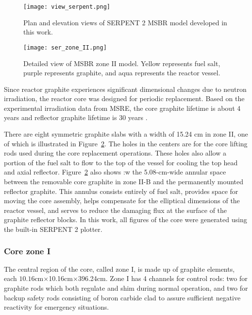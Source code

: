 \begin{figure}[hbp!] %
  \texttt{[image: view\_serpent.png]}
  \caption{Plan and elevation views of SERPENT 2 \gls{MSBR} model developed in 
  this work.}
  \label{fig:serpent_plan_view}
\end{figure}

\begin{figure}[t!] %
  \texttt{[image: ser\_zone\_II.png]}
  \caption{Detailed view of \gls{MSBR} zone II model.  
          Yellow represents fuel salt, purple represents graphite, and aqua represents the reactor vessel.}
  \label{fig:serpent_zoneII}
\end{figure}

Since reactor graphite experiences significant dimensional changes due to 
neutron irradiation, the reactor core was designed for periodic replacement. 
Based on the experimental irradiation data from \gls{MSRE}, the core graphite 
lifetime is about 4 years and reflector graphite lifetime is 30 years 
\cite{robertson_conceptual_1971}.

There are eight symmetric graphite slabs with a width of 15.24 cm in zone II, 
one of which is illustrated in Figure~\ref{fig:serpent_zoneII}. The holes in 
the centers are for the core lifting rods used during the core replacement 
operations. These holes also allow a portion of the fuel salt to flow to the 
top of the vessel for cooling the top head and axial reflector. 
Figure~\ref{fig:serpent_zoneII} also shows :w
the 5.08-cm-wide annular 
space between the removable core graphite in zone II-B and the permanently 
mounted reflector graphite. This annulus consists entirely of fuel salt, 
provides space for moving the core assembly, helps compensate for the elliptical 
dimensions of the reactor vessel, and serves to reduce the damaging flux at the 
surface of the graphite reflector blocks. In this work, all figures of the core 
were generated using the built-in SERPENT 2 plotter. 


\subsubsection{Core zone I}
The central region of the core, called zone I, is made up of graphite elements, 
each $10.16$cm$\times$10.16cm$\times$396.24cm. Zone I has 4 channels for 
control rods: two for graphite rods which both regulate and shim during normal 
operation, and two for backup safety rods consisting of boron carbide clad to 
assure sufficient negative reactivity for emergency situations.

